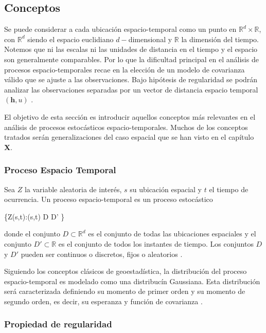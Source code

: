 \documentclass[
]{book}
\begin{document}
\hypertarget{conceptos}{%
\subsection{Conceptos}\label{conceptos}}

Se puede considerar a cada ubicación espacio-temporal como un punto en \(\mathbb{R}^d \times \mathbb{R}\), con \(\mathbb{R}^d\) siendo el espacio euclidiano \(d-\)dimensional y \(\mathbb{R}\) la dimensión del tiempo. Notemos que ni las escalas ni las unidades de distancia en el tiempo y el espacio son generalmente comparables. Por lo que la dificultad principal en el análisis de procesos espacio-temporales recae en la elección de un modelo de covarianza válido que se ajuste a las observaciones. Bajo hipótesis de regularidad se podrán analizar las observaciones separadas por un vector de distancia espacio temporal \((\textbf{h},u)\) \citep{gstcasal}.

El objetivo de esta sección es introducir aquellos conceptos más relevantes en el análisis de procesos estocásticos espacio-temporales. Muchos de los conceptos tratados serán generalizaciones del caso espacial que se han visto en el capítulo \textbf{X}.

\hypertarget{proceso-espacio-temporal-1}{%
\subsubsection*{Proceso Espacio Temporal}\label{proceso-espacio-temporal-1}}

Sea \(Z\) la variable aleatoria de interés, \(s\) su ubicación espacial y \(t\) el tiempo de ocurrencia. Un proceso espacio-temporal es un proceso estocástico

\{Z(s,t):(s,t) \in D \times D' \}

donde el conjunto \(D \subset \mathbb{R}^d\) es el conjunto de todas las ubicaciones espaciales y el conjunto \(D' \subset \mathbb{R}\) es el conjunto de todos los instantes de tiempo. Los conjuntos \(D\) y \(D'\) pueden ser continuos o discretos, fijos o aleatorios \citep{marta}.

Siguiendo los conceptos clásicos de geoestadística, la distribución del proceso espacio-temporal es modelado como una distribucín Gaussiana. Esta distribución será caracterizada definiendo su momento de primer orden y su momento de segundo orden, es decir, su esperanza y función de covarianza \citep{montero}.

\hypertarget{propiedad-de-regularidad}{%
\subsubsection*{Propiedad de regularidad}\label{propiedad-de-regularidad}}
\end{document}
